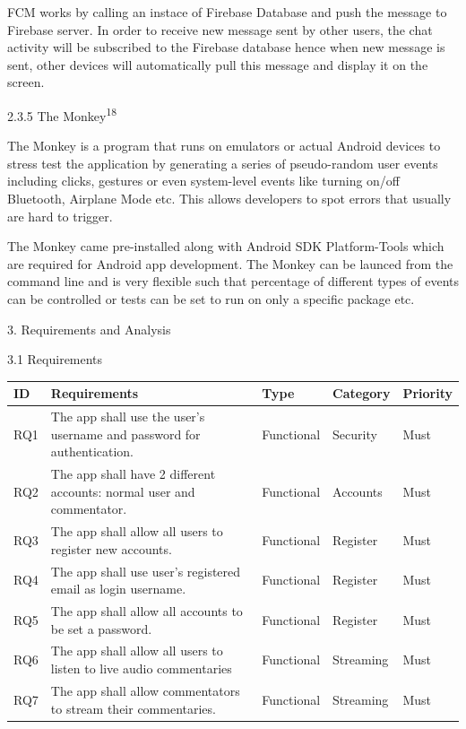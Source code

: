 \documentclass{article}
\begin{document}
\begin{flushleft}
FCM works by calling an instace of Firebase Database and push the message to Firebase server. In order to receive new message sent by other users, the chat activity will be subscribed to the Firebase database hence when new message is sent, other devices will automatically pull this message and display it on the screen.\par
{\large 2.3.5 The Monkey\textsuperscript{18}}\par
The Monkey is a program that runs on emulators or actual Android devices to stress test the application by generating a series of pseudo-random user events including clicks, gestures or even system-level events like turning on/off Bluetooth, Airplane Mode etc. This allows developers to spot errors that usually are hard to trigger.\par
The Monkey came pre-installed along with Android SDK Platform-Tools which are required for Android app development. The Monkey can be launced from the command line and is very flexible such that percentage of different types of events can be controlled or tests can be set to run on only a specific package etc.\par
{\huge 3. Requirements and Analysis}\par
{\Large 3.1 Requirements}\par
\begin{longtable}[t]{| p{1cm} | p{6cm} | p{1.8cm} | p{2cm} | p{1.2cm} |}
\hline
ID & Requirements & Type & Category & Priority \\
\hline
RQ1 & The app shall use the user's username and password for authentication. & Functional & Security & Must\\
\hline
RQ2 & The app shall have 2 different accounts: normal user and commentator. & Functional & Accounts & Must\\
\hline
RQ3 & The app shall allow all users to register new accounts. & Functional & Register & Must\\
\hline
RQ4 & The app shall use user's registered email as login username. & Functional & Register & Must\\
\hline
RQ5 & The app shall allow all accounts to be set a password. & Functional & Register & Must\\
\hline
RQ6 & The app shall allow all users to listen to live audio commentaries & Functional & Streaming & Must\\
\hline
RQ7 & The app shall allow commentators to stream their commentaries. & Functional & Streaming & Must\\
\hline

\end{longtable}
\end{flushleft}
\end{document}
